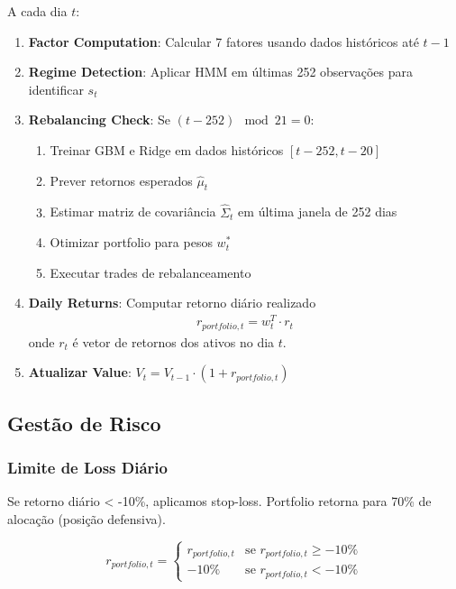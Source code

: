 \documentclass[12pt,a4paper]{article}
\begin{document}
A cada dia $t$:

\begin{enumerate}
    \item \textbf{Factor Computation}: Calcular 7 fatores usando dados históricos até $t-1$
    
    \item \textbf{Regime Detection}: Aplicar HMM em últimas 252 observações para identificar $s_t$
    
    \item \textbf{Rebalancing Check}: Se $(t - 252) \mod 21 = 0$:
    \begin{enumerate}
        \item Treinar GBM e Ridge em dados históricos $[t-252, t-20]$
        \item Prever retornos esperados $\hat{\mu}_t$
        \item Estimar matriz de covariância $\hat{\Sigma}_t$ em última janela de 252 dias
        \item Otimizar portfolio para pesos $w_t^*$
        \item Executar trades de rebalanceamento
    \end{enumerate}
    
    \item \textbf{Daily Returns}: Computar retorno diário realizado
    \begin{align}
        r_{portfolio,t} = w_t^T \cdot r_{t}
    \end{align}
    onde $r_t$ é vetor de retornos dos ativos no dia $t$.
    
    \item \textbf{Atualizar Value}: $V_t = V_{t-1} \cdot (1 + r_{portfolio,t})$
\end{enumerate}

\subsection{Gestão de Risco}

\subsubsection{Limite de Loss Diário}

Se retorno diário < -10\%, aplicamos stop-loss. Portfolio retorna para 70\% de alocação (posição defensiva).

\[
r_{portfolio,t} = \begin{cases}
r_{portfolio,t} & \text{se } r_{portfolio,t} \geq -10\% \\
-10\% & \text{se } r_{portfolio,t} < -10\%
\end{cases}
\]
\end{document}
